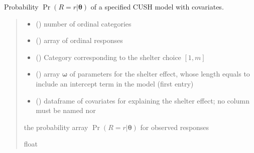 \documentclass[letterpaper,10pt,english]{sphinxmanual}
\begin{document}

\begin{fulllineitems}
\label{\detokenize{cubmods:cubmods.cush_x.proba}}
\pysigstartsignatures
{}
\pysigstopsignatures
\sphinxAtStartPar
Probability \(\Pr(R = r | \pmb\theta)\) of a specified CUSH model with covariates.
\begin{quote}\begin{description}
\begin{itemize}
\item {} 
\sphinxAtStartPar
{} () \textendash{} number of ordinal categories

\item {} 
\sphinxAtStartPar
{} () \textendash{} array of ordinal responses

\item {} 
\sphinxAtStartPar
{} () \textendash{} Category corresponding to the shelter choice \([1,m]\)

\item {} 
\sphinxAtStartPar
{} () \textendash{} array \(\pmb \omega\) of parameters for the shelter effect, whose length equals 
 to include an intercept term in the model (first entry)

\item {} 
\sphinxAtStartPar
{} () \textendash{} dataframe of covariates for explaining the shelter effect;
no column must be named  nor 

\end{itemize}

\sphinxAtStartPar
the probability array \(\Pr(R = r | \pmb\theta)\) for observed responses

\sphinxAtStartPar
float

\end{description}\end{quote}

\end{fulllineitems}
\end{document}
